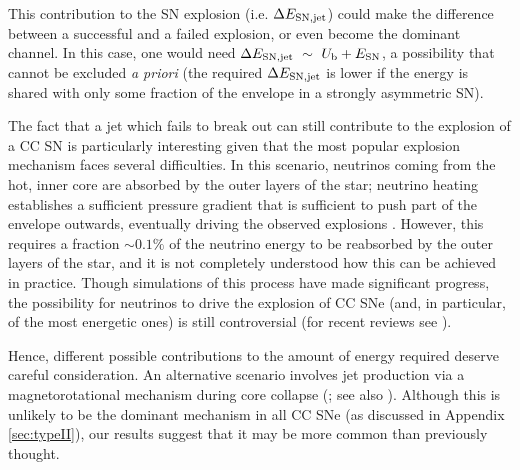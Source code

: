 \documentclass[useAMS,usenatbib]{mn2e}
\begin{document}
This contribution to the SN explosion (i.e. $\Delta E_{\rm SN,jet}$) could make the difference between a successful and a failed explosion, or even become the dominant channel. In this case, one would need $\Delta E_{\rm SN,jet}~\sim~U_{\rm b}+E_{\rm SN}$, a possibility that cannot be excluded {\it a priori} (the required $\Delta E_{\rm SN,jet}$ is lower if the energy is shared with only some fraction of the envelope in a strongly asymmetric SN).

The fact that a jet which fails to break out can still contribute to the explosion of a CC SN is particularly interesting given that the most popular explosion mechanism faces several difficulties.
In this scenario, neutrinos coming from the hot, inner core are absorbed by the outer layers of the star; neutrino heating establishes a sufficient pressure gradient that is sufficient to push part of the envelope outwards, eventually driving the observed explosions \citep{BetheWilson1985}. However, this requires a fraction $\sim 0.1\%$ of the neutrino energy to be reabsorbed by the outer layers of the star, and it is not completely understood how this can be achieved in practice. Though simulations of this process have made significant progress, the possibility for neutrinos to drive the explosion of CC SNe (and, in particular, of the most energetic ones) is still controversial (for recent reviews see \citealt{Janka2012,Janka2016}).

Hence, different possible contributions to the amount of energy required deserve careful consideration. An alternative scenario involves jet production via a magnetorotational mechanism during core collapse (\citealt{LeblancWilson1970}; see also \citealt{OstrikerGunn1971, Bisnovatyi-Kogan1971}). Although this is unlikely to be the dominant mechanism in all CC SNe (as discussed in Appendix \ref{sec:typeII}), our results suggest that it may be more common than previously thought.
\end{document}
